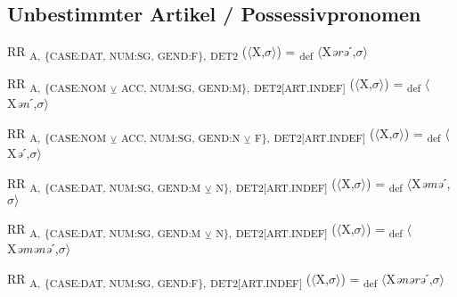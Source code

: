 {\subsection{Unbestimmter Artikel / Possessivpronomen}

\begin{exe}
 RR \textsubscript{A,} \textsubscript{\{CASE:DAT, NUM:SG, GEND:F\},} \textsubscript{DET2} ($\langle$X,$\sigma $$\rangle$) = \textsubscript{def} $\langle$X\textit{ərə}ˊ,$\sigma $$\rangle$
\end{exe}

\begin{exe}
 RR \textsubscript{A,} \textsubscript{\{CASE:NOM} \textsubscript{${\veebar}$}\textsubscript{ ACC, NUM:SG, GEND:M\},} \textsubscript{DET2[ART.INDEF]} ($\langle$X,$\sigma $$\rangle$) = \textsubscript{def} $\langle$X\textit{ən}ˊ,$\sigma $$\rangle$
\end{exe}

\begin{exe}
 RR \textsubscript{A,} \textsubscript{\{CASE:NOM} \textsubscript{${\veebar}$}\textsubscript{ ACC, NUM:SG, GEND:N} \textsubscript{${\veebar}$}\textsubscript{ F\},} \textsubscript{DET2[ART.INDEF]} ($\langle$X,$\sigma $$\rangle$) = \textsubscript{def} $\langle$X\textit{ə}ˊ,$\sigma $$\rangle$
\end{exe}

\begin{exe}
 RR \textsubscript{A,} \textsubscript{\{CASE:DAT, NUM:SG, GEND:M} \textsubscript{${\veebar}$}\textsubscript{ N\},} \textsubscript{DET2[ART.INDEF]} ($\langle$X,$\sigma $$\rangle$) = \textsubscript{def} $\langle$X\textit{əmə}ˊ,$\sigma $$\rangle$
\end{exe}

\begin{exe}
 RR \textsubscript{A,} \textsubscript{\{CASE:DAT, NUM:SG, GEND:M} \textsubscript{${\veebar}$}\textsubscript{ N\},} \textsubscript{DET2[ART.INDEF]} ($\langle$X,$\sigma $$\rangle$) = \textsubscript{def} $\langle$X\textit{əmənə}ˊ,$\sigma $$\rangle$
\end{exe}

\begin{exe}
 RR \textsubscript{A,} \textsubscript{\{CASE:DAT, NUM:SG, GEND:F\},} \textsubscript{DET2[ART.INDEF]} ($\langle$X,$\sigma $$\rangle$) = \textsubscript{def} $\langle$X\textit{ənərə}ˊ,$\sigma $$\rangle$
\end{exe}

}
